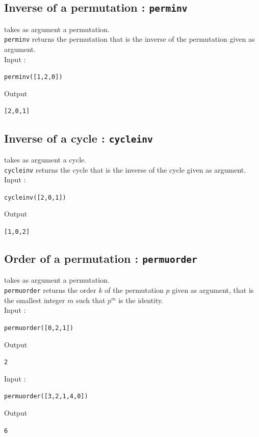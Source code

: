 \documentclass[a4paper,11pt]{book}
\begin{document}
\subsection{Inverse of a permutation : {\tt perminv}}
 takes as argument a permutation.\\
{\tt perminv} returns the permutation that is the inverse of the permutation 
given as argument.\\
Input :
\begin{center}{\tt perminv([1,2,0])}\end{center}
Output
\begin{center}{\tt [2,0,1]}\end{center}

\subsection{Inverse of a cycle : {\tt cycleinv}}
 takes as argument a cycle.\\
{\tt cycleinv} returns the cycle that is the inverse of the cycle given as 
argument.\\
Input :
\begin{center}{\tt cycleinv([2,0,1])}\end{center}
Output
\begin{center}{\tt [1,0,2]}\end{center}

\subsection{Order of a permutation : {\tt permuorder}}
 takes as argument a permutation.\\
{\tt permuorder} returns the order $k$ of the permutation $p$ given as 
argument, that is the smallest integer $m$ such that $p^m$ is the identity.\\
Input :
\begin{center}{\tt permuorder([0,2,1])}\end{center}
Output
\begin{center}{\tt 2}\end{center}
Input :
\begin{center}{\tt permuorder([3,2,1,4,0])}\end{center}
Output
\begin{center}{\tt 6}\end{center}
\end{document}
